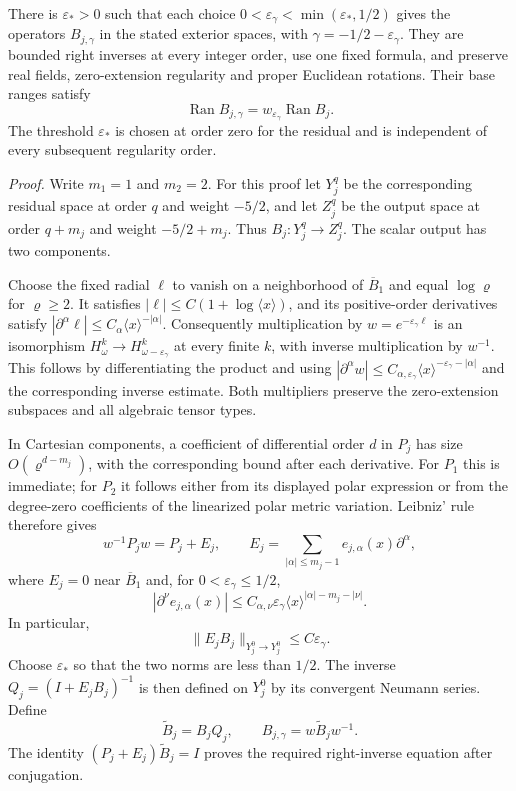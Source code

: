 \documentclass[
  english,
  11pt,
  reqno]{amsart}
\begin{document}
There is \(\varepsilon_*>0\) such that each choice
\(0<\varepsilon_\gamma<\min(\varepsilon_*,1/2)\) gives the operators
\(B_{j,\gamma}\) in the stated exterior spaces, with
\(\gamma=-1/2-\varepsilon_\gamma\). They are bounded right inverses at
every integer order, use one fixed formula, and preserve real fields,
zero-extension regularity and proper Euclidean rotations. Their base
ranges satisfy \[
\operatorname{Ran}B_{j,\gamma}
=w_{\varepsilon_\gamma}\operatorname{Ran}B_j.
\] The threshold \(\varepsilon_*\) is chosen at order zero for the
residual and is independent of every subsequent regularity order.

\emph{Proof.} Write \(m_1=1\) and \(m_2=2\). For this proof let
\(Y_j^q\) be the corresponding residual space at order \(q\) and weight
\(-5/2\), and let \(Z_j^q\) be the output space at order \(q+m_j\) and
weight \(-5/2+m_j\). Thus \(B_j:Y_j^q\to Z_j^q\). The scalar output has
two components.

Choose the fixed radial \(\ell\) to vanish on a neighborhood of
\(\overline B_1\) and equal \(\log\varrho\) for \(\varrho\ge2\). It
satisfies \(|\ell|\le C(1+\log\langle x\rangle)\), and its
positive-order derivatives satisfy
\(|\partial^\alpha\ell|\le C_\alpha\langle x\rangle^{-|\alpha|}\).
Consequently multiplication by \(w=e^{-\varepsilon_\gamma\ell}\) is an
isomorphism \(H^k_\omega\to H^k_{\omega-\varepsilon_\gamma}\) at every
finite \(k\), with inverse multiplication by \(w^{-1}\). This follows by
differentiating the product and using
\(|\partial^\alpha w|\le C_{\alpha,\varepsilon_\gamma}
\langle x\rangle^{-\varepsilon_\gamma-|\alpha|}\) and the corresponding
inverse estimate. Both multipliers preserve the zero-extension subspaces
and all algebraic tensor types.

In Cartesian components, a coefficient of differential order \(d\) in
\(P_j\) has size \(O(\varrho^{d-m_j})\), with the corresponding bound
after each derivative. For \(P_1\) this is immediate; for \(P_2\) it
follows either from its displayed polar expression or from the
degree-zero coefficients of the linearized polar metric variation.
Leibniz' rule therefore gives \[
w^{-1}P_jw=P_j+E_j,\qquad
E_j=\sum_{|\alpha|\le m_j-1}e_{j,\alpha}(x)\partial^\alpha,
\] where \(E_j=0\) near \(\overline B_1\) and, for
\(0<\varepsilon_\gamma\le1/2\), \[
|\partial^\nu e_{j,\alpha}(x)|
\le C_{\alpha,\nu}\varepsilon_\gamma
\langle x\rangle^{|\alpha|-m_j-|\nu|}.
\] In particular, \[
\|E_jB_j\|_{Y_j^0\to Y_j^0}
\le C\varepsilon_\gamma.
\] Choose \(\varepsilon_*\) so that the two norms are less than \(1/2\).
The inverse \(Q_j=(I+E_jB_j)^{-1}\) is then defined on \(Y_j^0\) by its
convergent Neumann series. Define \[
\widetilde B_j=B_jQ_j,\qquad
B_{j,\gamma}=w\widetilde B_jw^{-1}.
\] The identity \((P_j+E_j)\widetilde B_j=I\) proves the required
right-inverse equation after conjugation.
\end{document}
